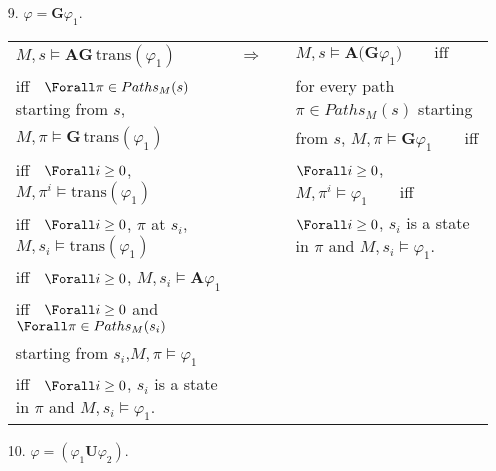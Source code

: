 {\begin{enumerate}
\item[9.] $\varphi =\mathbf{G}\varphi _{1}.$

\begin{tabular}{lcl}
$M,s\vDash \mathbf{AG}\,\mathrm{trans}(\varphi _{1})$ & $ \Rightarrow
\quad $ & $M,s\vDash \mathbf{A(G}\varphi _{1})\qquad \text{iff}$ \\ 
iff$\quad \Forall\pi \in Paths_{M}(s)$ starting from $s$, &  & for every
path $\pi \in Paths_{M}(s)$ starting \\ 
$M,\pi \vDash \mathbf{G}\,\mathrm{trans}(\varphi _{1})$ &  &  from $s$, $%
M,\pi \vDash \mathbf{G}\varphi _{1}\qquad $iff \\ 
iff$\quad \Forall i\geq 0$, $M,\pi ^{i}\vDash \mathrm{trans}(\varphi _{1})$
&  & $\Forall i\geq 0$, $M,\pi ^{i}\vDash \varphi _{1}\qquad $iff \\ 
iff$\quad \Forall i\geq 0$, $\pi $ at $s_{i}$, $M,s_{i}\vDash \mathrm{trans}%
(\varphi _{1})$ &  & $\Forall i\geq 0$, $s_{i}$ is a state in $\pi $ and $%
M,s_{i}\vDash \varphi _{1}$. \\ 
iff$\quad \Forall i\geq 0$, $M,s_{i}\vDash \mathbf{A}\varphi _{1}$ &  &  \\ 
iff$\quad \Forall i\geq 0$ and $\Forall\pi \in Paths_{M}(s_{i})$ &  &  \\ 
starting from $s_{i}$,$M,\pi \vDash \varphi _{1}$ &  &  \\ 
iff$\quad \Forall i\geq 0$, $s_{i}$ is a state in $\pi $ and $M,s_{i}\vDash
\varphi _{1}$. &  & 
\end{tabular}

\item[10.] $\varphi =(\varphi _{1}\mathbf{U}\varphi _{2}).$


\end{enumerate}}
